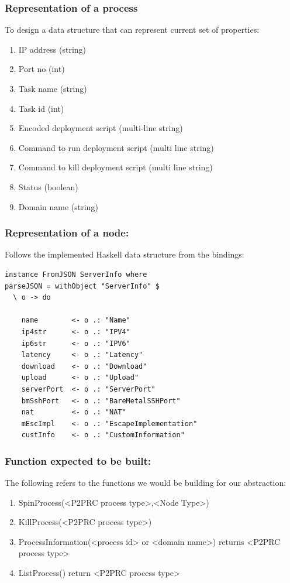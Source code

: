 \documentclass[11pt]{article}
\begin{document}
\subsubsection{Representation of a process}
\label{sec:org07241c8}
To design a data structure that can represent current set of properties:
\begin{enumerate}
\item IP address (string)
\item Port no (int)
\item Task name (string)
\item Task id (int)
\item Encoded deployment script (multi-line string)
\item Command to run deployment script (multi line string)
\item Command to kill deployment script (multi line string)
\item Status (boolean)
\item Domain name (string)
\end{enumerate}

\subsubsection{Representation of a node:}
\label{sec:org7837ede}
Follows the implemented Haskell data structure from the bindings:
\begin{verbatim}
instance FromJSON ServerInfo where
parseJSON = withObject "ServerInfo" $
  \ o -> do

    name        <- o .: "Name"
    ip4str      <- o .: "IPV4"
    ip6str      <- o .: "IPV6"
    latency     <- o .: "Latency"
    download    <- o .: "Download"
    upload      <- o .: "Upload"
    serverPort  <- o .: "ServerPort"
    bmSshPort   <- o .: "BareMetalSSHPort"
    nat         <- o .: "NAT"
    mEscImpl    <- o .: "EscapeImplementation"
    custInfo    <- o .: "CustomInformation"
\end{verbatim}

\subsubsection{Function expected to be built:}
\label{sec:org27760db}
The following refers to the functions we would be building for our abstraction:
\begin{enumerate}
\item SpinProcess(<P2PRC process type>,<Node Type>)
\item KillProcess(<P2PRC process type>)
\item ProcessInformation(<process id> or <domain name>) returns <P2PRC process type>
\item ListProcess() return <P2PRC process type>
\end{enumerate}
\end{document}
